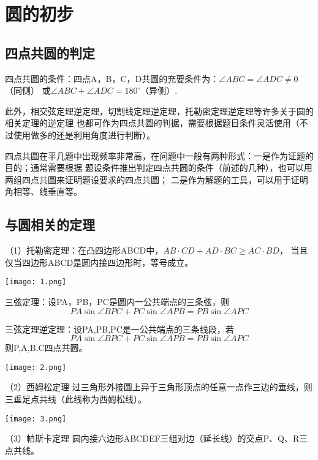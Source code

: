 \section{圆的初步}
\subsection{四点共圆的判定}
四点共圆的条件：四点A，B，C，D共圆的充要条件为：$\angle{ABC}=\angle{ADC}\neq0$（同侧）
或$\angle{ABC}+\angle{ADC}=180^{\circ}$（异侧）.

此外，相交弦定理逆定理，切割线定理逆定理，托勒密定理逆定理等许多关于圆的相关定理的逆定理
也都可作为四点共圆的判据，需要根据题目条件灵活使用（不过使用做多的还是利用角度进行判断）。

四点共圆在平几题中出现频率非常高，在问题中一般有两种形式：一是作为证题的目的；通常需要根据
题设条件推出判定四点共圆的条件（前述的几种），也可以用两组四点共圆来证明题设要求的四点共圆；
二是作为解题的工具，可以用于证明角相等、线垂直等。
\begin{figure}[H]
    \centering  
    \subfigure{
    \texttt{[image: 4]}}
    \subfigure{
    \texttt{[image: 5]}}
\end{figure}
\subsection{与圆相关的定理}
（1）托勒密定理：在凸四边形ABCD中，$AB\cdot CD+AD\cdot BC\geq AC\cdot BD$，
当且仅当四边形ABCD是圆内接四边形时，等号成立。
\begin{center}
    \texttt{[image: 1.png]}
\end{center}

三弦定理：设PA，PB，PC是圆内一公共端点的三条弦，则
$$PA\sin{\angle{BPC}}+PC\sin{\angle{APB}}=PB\sin{\angle{APC}}$$

三弦定理逆定理：设PA,PB,PC是一公共端点的三条线段，若
$$PA\sin{\angle{BPC}}+PC\sin{\angle{APB}}=PB\sin{\angle{APC}}$$
则P,A,B,C四点共圆。
\begin{center}
    \texttt{[image: 2.png]}
\end{center}

（2）西姆松定理
过三角形外接圆上异于三角形顶点的任意一点作三边的垂线，则三垂足点共线（此线称为西姆松线）。
\begin{center}
    \texttt{[image: 3.png]}
\end{center}

（3）帕斯卡定理
圆内接六边形ABCDEF三组对边（延长线）的交点P、Q、R三点共线。
\begin{figure}[H]
    \centering  
    \subfigure{
    \texttt{[image: 6]}}
    \subfigure{
    \texttt{[image: 7]}}
\end{figure}
\newpage
